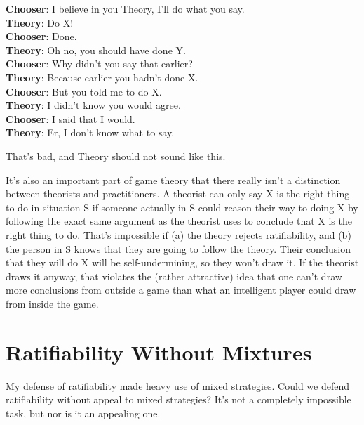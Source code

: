 \documentclass[
  12pt,
  letterpaper,
  DIV=11,
  numbers=noendperiod]{scrreprt}
\begin{document}
\textbf{Chooser}: I believe in you Theory, I'll do what you say.\\
\textbf{Theory}: Do X!\\
\textbf{Chooser}: Done.\\
\textbf{Theory}: Oh no, you should have done Y.\\
\textbf{Chooser}: Why didn't you say that earlier?\\
\textbf{Theory}: Because earlier you hadn't done X.\\
\textbf{Chooser}: But you told me to do X.\\
\textbf{Theory}: I didn't know you would agree.\\
\textbf{Chooser}: I said that I would.\\
\textbf{Theory}: Er, I don't know what to say.

That's bad, and Theory should not sound like this.

It's also an important part of game theory that there really isn't a
distinction between theorists and practitioners. A theorist can only say
X is the right thing to do in situation S if someone actually in S could
reason their way to doing X by following the exact same argument as the
theorist uses to conclude that X is the right thing to do. That's
impossible if (a) the theory rejects ratifiability, and (b) the person
in S knows that they are going to follow the theory. Their conclusion
that they will do X will be self-undermining, so they won't draw it. If
the theorist draws it anyway, that violates the (rather attractive) idea
that one can't draw more conclusions from outside a game than what an
intelligent player could draw from inside the game.

\hypertarget{ratifiability-without-mixtures}{%
\section{Ratifiability Without
Mixtures}\label{ratifiability-without-mixtures}}

My defense of ratifiability made heavy use of mixed strategies. Could we
defend ratifiability without appeal to mixed strategies? It's not a
completely impossible task, but nor is it an appealing one.
\end{document}
